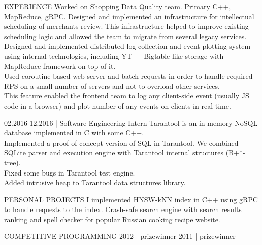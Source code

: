 \documentclass[12pt]{cutecv}
\begin{document}
\begin{paracol}{2}
\begin{leftcolumn}
\end{leftcolumn}

\begin{rightcolumn}
\begin{cvsection}{EXPERIENCE}
  {Worked on Shopping Data Quality team. Primary C++, MapReduce, gRPC.
   Designed and implemented an infrastructure for intellectual scheduling of merchants review. This infrastructure helped to improve existing scheduling logic
   and allowed the team to migrate from several legacy services.}
  {Designed and implemented distributed log collection and event
   plotting system using internal technologies, including YT — Bigtable-like
   storage with MapReduce framework on top of it. \\
   Used coroutine-based web server and batch requests in order
   to handle required RPS on a small number of servers and not to overload
   other services. \\
   This feature enabled the frontend team to log any client-side
   event (usually JS code in a browser) and plot number of any events on
   clients in real time.}

  {02.2016-12.2016 | Software Engineering Intern}
  {Tarantool is an in-memory NoSQL database implemented in C with some C++.\\
   Implemented a proof of concept version of SQL in Tarantool.
   We combined SQLite parser and execution engine with Tarantool internal structures (B+*-tree).\\
   Fixed some bugs in Tarantool test engine.\\
   Added intrusive heap to Tarantool data structures library.}
\end{cvsection}

\begin{cvsection}{PERSONAL PROJECTS}
  {I implemented HNSW-kNN index in C++ using gRPC to
    handle requests to the index.}
  {}
  {Crash-safe search engine with search results
   ranking and spell checker for popular Russian cooking recipe website.}
\end{cvsection}
\begin{cvsection}{COMPETITIVE PROGRAMMING}
  {2012 | prizewinner}
  {}
  {2011 | prizewinner}
  {}
\end{cvsection}

\end{rightcolumn}
\end{paracol}
\end{document}
